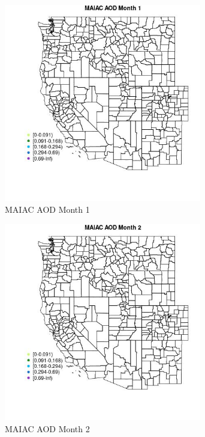 \begin{figure} 
\centering  
\includegraphics[width=0.77\textwidth]{Code_Outputs/Report_ML_input_PM25_Step4_part_e_de_duplicated_aveswNAs_MapObsMo1MAIAC_AOD.jpg} 
\caption{\label{fig:Report_ML_input_PM25_Step4_part_e_de_duplicated_aveswNAsMapObsMo1MAIAC_AOD}MAIAC AOD Month 1} 
\end{figure} 
 

\begin{figure} 
\centering  
\includegraphics[width=0.77\textwidth]{Code_Outputs/Report_ML_input_PM25_Step4_part_e_de_duplicated_aveswNAs_MapObsMo2MAIAC_AOD.jpg} 
\caption{\label{fig:Report_ML_input_PM25_Step4_part_e_de_duplicated_aveswNAsMapObsMo2MAIAC_AOD}MAIAC AOD Month 2} 
\end{figure} 
 

